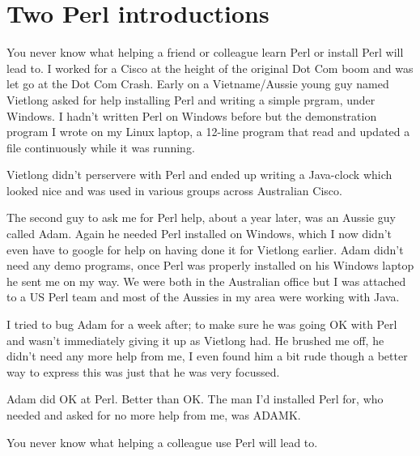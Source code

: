 \documentclass{article}      %
\begin{document}
\section{Two Perl introductions}

You never know what helping a friend or colleague learn Perl or
install Perl will lead to. I worked for a Cisco at the height of the
original Dot Com boom and was let go at the Dot Com Crash. Early on a
Vietname/Aussie young guy named Vietlong asked for help installing
Perl and writing a simple prgram, under Windows. I hadn't written Perl
on Windows before but the demonstration program I wrote on my Linux
laptop, a 12-line program that read and updated a file continuously
while it was running.

Vietlong didn't perservere with Perl and ended up writing a Java-clock
which looked nice and was used in various groups across Australian
Cisco.

The second guy to ask me for Perl help, about a year later, was an
Aussie guy called Adam. Again he needed Perl installed on Windows,
which I now didn't even have to google for help on having done it for
Vietlong earlier. Adam didn't need any demo programs, once Perl was
properly installed on his Windows laptop he sent me on my way. We were
both in the Australian office but I was attached to a US Perl team and
most of the Aussies in my area were working with Java.

I tried to bug Adam for a week after; to make sure he was going OK
with Perl and wasn't immediately giving it up as Vietlong had. He
brushed me off, he didn't need any more help from me, I even found him
a bit rude though a better way to express this was just that he was
very focussed.

Adam did OK at Perl. Better than OK. The man I'd installed Perl for,
who needed and asked for no more help from me, was ADAMK.

You never know what helping a colleague use Perl will lead to.
\end{document}
